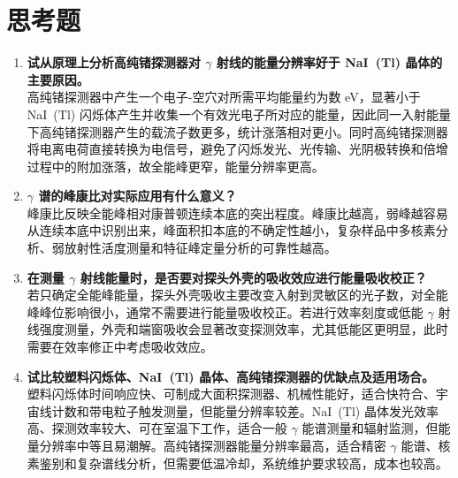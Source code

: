 \documentclass[12pt,a4paper]{article}
\begin{document}
\section{思考题}
\begin{enumerate}
    \item \textbf{试从原理上分析高纯锗探测器对 $\gamma$ 射线的能量分辨率好于 NaI~(Tl) 晶体的主要原因。}\\
    高纯锗探测器中产生一个电子-空穴对所需平均能量约为数 \si{eV}，显著小于 NaI~(Tl) 闪烁体产生并收集一个有效光电子所对应的能量，因此同一入射能量下高纯锗探测器产生的载流子数更多，统计涨落相对更小。同时高纯锗探测器将电离电荷直接转换为电信号，避免了闪烁发光、光传输、光阴极转换和倍增过程中的附加涨落，故全能峰更窄，能量分辨率更高。
    \item \textbf{$\gamma$ 谱的峰康比对实际应用有什么意义？}\\
    峰康比反映全能峰相对康普顿连续本底的突出程度。峰康比越高，弱峰越容易从连续本底中识别出来，峰面积扣本底的不确定性越小，复杂样品中多核素分析、弱放射性活度测量和特征峰定量分析的可靠性越高。
    \item \textbf{在测量 $\gamma$ 射线能量时，是否要对探头外壳的吸收效应进行能量吸收校正？}\\
    若只确定全能峰能量，探头外壳吸收主要改变入射到灵敏区的光子数，对全能峰峰位影响很小，通常不需要进行能量吸收校正。若进行效率刻度或低能 $\gamma$ 射线强度测量，外壳和端窗吸收会显著改变探测效率，尤其低能区更明显，此时需要在效率修正中考虑吸收效应。
    \item \textbf{试比较塑料闪烁体、NaI~(Tl) 晶体、高纯锗探测器的优缺点及适用场合。}\\
    塑料闪烁体时间响应快、可制成大面积探测器、机械性能好，适合快符合、宇宙线计数和带电粒子触发测量，但能量分辨率较差。NaI~(Tl) 晶体发光效率高、探测效率较大、可在室温下工作，适合一般 $\gamma$ 能谱测量和辐射监测，但能量分辨率中等且易潮解。高纯锗探测器能量分辨率最高，适合精密 $\gamma$ 能谱、核素鉴别和复杂谱线分析，但需要低温冷却，系统维护要求较高，成本也较高。
\end{enumerate}
\end{document}
